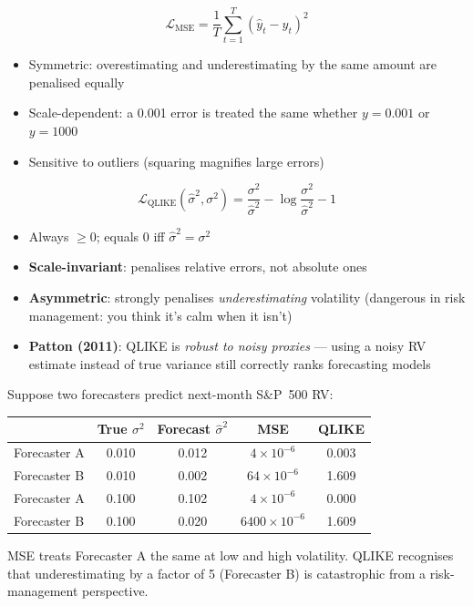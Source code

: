 \documentclass[11pt]{article}
\newcommand{\mathblock}[2]{%
  \begin{tcolorbox}[mathbox, title={Math: #1}]
  #2
  \end{tcolorbox}
}
\newcommand{\example}[2]{%
  \begin{tcolorbox}[examplebox, title={Concrete Example: #1}]
  #2
  \end{tcolorbox}
}
\begin{document}
\mathblock{MSE --- Mean Squared Error}{
\[
  \mathcal{L}_{\text{MSE}} = \frac{1}{T}\sum_{t=1}^{T}(\hat{y}_t - y_t)^2
\]
\begin{itemize}
  \item Symmetric: overestimating and underestimating by the same amount
        are penalised equally
  \item Scale-dependent: a 0.001 error is treated the same whether
        $y = 0.001$ or $y = 1000$
  \item Sensitive to outliers (squaring magnifies large errors)
\end{itemize}
}

\mathblock{QLIKE --- Quasi-Likelihood Loss}{
\[
  \mathcal{L}_{\text{QLIKE}}(\hat\sigma^2, \sigma^2)
  = \frac{\sigma^2}{\hat\sigma^2} - \log\!\frac{\sigma^2}{\hat\sigma^2} - 1
\]
\begin{itemize}
  \item Always $\geq 0$; equals 0 iff $\hat\sigma^2 = \sigma^2$
  \item \textbf{Scale-invariant}: penalises relative errors,
        not absolute ones
  \item \textbf{Asymmetric}: strongly penalises \emph{underestimating}
        volatility (dangerous in risk management: you think it's calm
        when it isn't)
  \item \textbf{Patton (2011)}: QLIKE is \emph{robust to noisy proxies} ---
        using a noisy RV estimate instead of true variance still correctly
        ranks forecasting models
\end{itemize}
}

\example{Why QLIKE $>$ MSE for Volatility}{
Suppose two forecasters predict next-month S\&P~500 RV:
\begin{center}
\begin{tabular}{lcccc}
\toprule
& True $\sigma^2$ & Forecast $\hat\sigma^2$ & MSE & QLIKE \\
\midrule
Forecaster A & 0.010 & 0.012 & $4\!\times\!10^{-6}$ & 0.003 \\
Forecaster B & 0.010 & 0.002 & $64\!\times\!10^{-6}$ & 1.609 \\
\midrule
Forecaster A & 0.100 & 0.102 & $4\!\times\!10^{-6}$ & 0.000 \\
Forecaster B & 0.100 & 0.020 & $6400\!\times\!10^{-6}$ & 1.609 \\
\bottomrule
\end{tabular}
\end{center}
MSE treats Forecaster A the same at low and high volatility.
QLIKE recognises that underestimating by a factor of 5 (Forecaster B)
is catastrophic from a risk-management perspective.
}
\end{document}
